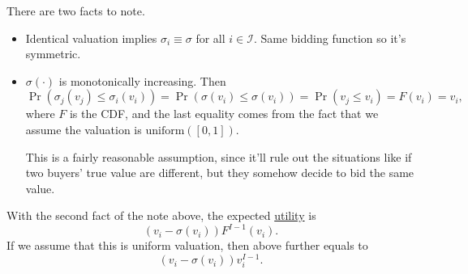 \begin{note}
	There are two facts to note.
	\begin{itemize}
		\item Identical valuation implies \(\sigma_{i} \equiv \sigma\) for all \(i\in \mathcal{I} \). Same bidding function so it's symmetric.
		\item \(\sigma(\cdot)\) is monotonically increasing. Then
		      \[
			      \Pr(\sigma_{j}(v_{j})\leq \sigma_{i}(v_{i})) = \Pr(\sigma(v_{i})\leq \sigma(v_{i})) = \Pr(v_{j}\leq v_{i}) = F(v_{i}) = v_{i},
		      \]
		      where \(F\) is the CDF, and the last equality comes from the fact that we assume the valuation is \(\mathrm{uniform}([0, 1])\).

		      This is a fairly reasonable assumption, since it'll rule out the situations like if two buyers' true value are different, but they somehow decide to bid the same value.
	\end{itemize}
\end{note}

With the second fact of the note above, the expected \hyperref[def:reward]{utility}  is
\[
	(v_{i} - \sigma(v_{i})) F^{I-1}(v_{i}).
\]
If we assume that this is uniform valuation, then above further equals to
\[
	(v_{i} - \sigma(v_{i}))v^{I-1}_{i}.
\]